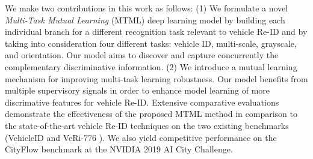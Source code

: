 \documentclass[10pt,twocolumn,letterpaper]{article}
\begin{document}
We make two contributions in this work as follows:
(1) We formulate a novel {\em Multi-Task Mutual Learning} (MTML) deep
learning model by building each individual branch for a different
recognition task relevant to vehicle Re-ID and by taking into
consideration four different tasks: vehicle ID, multi-scale, grayscale, and orientation.
Our model aims to discover and capture concurrently the complementary discriminative information.
(2) We introduce a mutual learning mechanism for improving multi-task learning robustness.
Our model benefits from multiple supervisory signals in order to
enhance model learning of more discrimative features for vehicle Re-ID.
Extensive comparative evaluations demonstrate the effectiveness of the
proposed MTML method in comparison to the state-of-the-art vehicle Re-ID techniques on the two existing benchmarks
(VehicleID \cite{liu2016vehicleid} and VeRi-776 \cite{liu2016veri}).
We also yield competitive performance on the CityFlow
\cite{tang2019cityflow} benchmark at the NVIDIA 2019 AI City Challenge.
\end{document}
